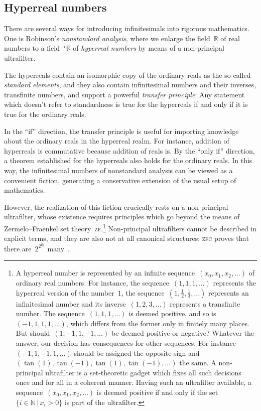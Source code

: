 \documentclass[oneside]{amsart}
\theoremstyle{definition}
\theoremstyle{plain}
\theoremstyle{remark}
\newcommand{\NN}{\mathbb{N}}
\newcommand{\RR}{\mathbb{R}}
\renewcommand{\_}{\mathpunct{.}\,}
\newcommand{\?}{\,{:}\,}
\begin{document}
\subsection{Hyperreal numbers} There are several ways for introducing
infinitesimals into rigorous mathematics. One is Robinson's \emph{nonstandard
analysis}, where we enlarge the field~$\RR$ of real numbers to a
field~$^\star\RR$ of \emph{hyperreal numbers} by means of a non-principal
ultrafilter.

The hyperreals contain an isomorphic copy of the ordinary reals as the
so-called \emph{standard elements}, and they also contain infinitesimal numbers
and their inverses, transfinite numbers, and support a powerful \emph{transfer
principle}: Any statement which doesn't refer to standardness is true for the
hyperreals if and only if it is true for the ordinary reals.

In the ``if'' direction, the transfer principle is useful for importing
knowledge about the ordinary reals in the hyperreal realm. For instance,
addition of hyperreals is commutative because addition of reals is.
By the ``only if'' direction, a theorem established for the hyperreals also
holds for the ordinary reals. In this way, the infinitesimal numbers of
nonstandard analysis can be viewed as a convenient fiction, generating a
conservative extension of the usual setup of mathematics.

However, the realization of this fiction crucically rests on a non-principal
ultrafilter, whose existence requires principles which go beyond the means of
Zermelo--Fraenkel set theory~\textsc{zf}.\footnote{A hyperreal number is
represented by an infinite sequence~$(x_0,x_1,x_2,\ldots)$ of ordinary real
numbers. For instance, the sequence~$(1,1,1,\ldots)$ represents the hyperreal
version of the number~$1$, the sequence~$(1,\frac{1}{2},\frac{1}{3},\ldots)$
represents an infinitesimal number and its inverse~$(1,2,3,\ldots)$ represents
a transfinite number.
%
The sequence~$(1,1,1,\ldots)$ is deemed positive, and so is~$(-1,1,1,1,\ldots)$,
which differs from the former only in finitely many places. But
should~$(1,-1,1,-1,\ldots)$ be deemed positive or negative? Whatever the
answer, our decision has consequences for other sequences. For
instance~$(-1,1,-1,1,\ldots)$ should be assigned the opposite sign
and~$(\tan(1),\tan(-1),\tan(1),\tan(-1),\ldots)$ the same.
%
A non-principal ultrafilter is a set-theoretic gadget which fixes all such
decisions once and for all in a coherent manner. Having such an ultrafilter
available, a sequence~$(x_0,x_1,x_2,\ldots)$ is deemed positive if and only if
the set~$\{i \in \NN \,|\, x_i > 0\}$ is part of the ultrafilter.}
Non-principal ultrafilters cannot be described in explicit terms, and
they are also not at all canonical structures: \textsc{zfc} proves that there
are~$2^{2^{\aleph_0}}$ many~\cite{pospisil:ultrafilters}.
\end{document}
